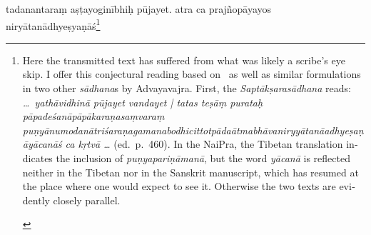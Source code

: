 \documentclass[naipra.tex]{subfiles}
\begin{document}
\begin{sanskrit}

\pstart
tadanantaraṃ  aṣṭayoginībhiḥ pūjayet.
atra ca prajñopāyayos niryātanādhyeṣyaṇāś\footnote{
	\begin{english}%
		Here the transmitted text has suffered from what was likely a scribe's eye skip.
		I offer this conjectural reading based on \TIB\ as well as similar formulations in two other \emph{sādhana}s by Advayavajra.
		First, the \emph{Saptākṣarasādhana} reads: \emph{\ldots\ yathāvidhinā pūjayet vandayet | tatas teṣāṃ purataḥ pāpadeśanāpāpākaraṇasaṃvaraṃ puṇyānumodanātriśaraṇagamanabodhicittotpāda\dsh ātmabhāvaniryyātanā\dsh adhyeṣaṇāyācanāś ca kṛtvā \ldots } (ed.\ p.\ 460).
		In the NaiPra, the Tibetan translation indicates the inclusion of \emph{puṇyapariṇāmanā}, but the word \emph{yācanā} is reflected neither in the Tibetan nor in the Sanskrit manuscript, which has resumed at the place where one would expect to see it.
		Otherwise the two texts are evidently closely parallel.


\end{english}}
\end{sanskrit}
\end{document}
